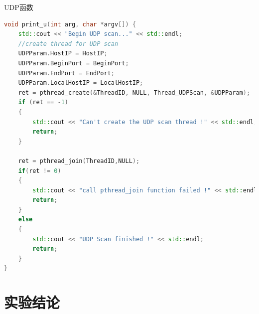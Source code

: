 \documentclass[UTF8,a4paper,10pt]{ctexart}
\begin{document}
UDP函数
\begin{lstlisting}[language = C++]
void print_u(int arg, char *argv[]) {
    std::cout << "Begin UDP scan..." << std::endl;
    //create thread for UDP scan
    UDPParam.HostIP = HostIP;
    UDPParam.BeginPort = BeginPort;
    UDPParam.EndPort = EndPort;
    UDPParam.LocalHostIP = LocalHostIP;
    ret = pthread_create(&ThreadID, NULL, Thread_UDPScan, &UDPParam);
    if (ret == -1) 
    {
        std::cout << "Can't create the UDP scan thread !" << std::endl;
        return;
    }

    ret = pthread_join(ThreadID,NULL);
    if(ret != 0)
    {
        std::cout << "call pthread_join function failed !" << std::endl;
        return;
    }
    else
    {
        std::cout << "UDP Scan finished !" << std::endl;
        return;
    }
}
\end{lstlisting}



































\section{实验结论}
\end{document}
